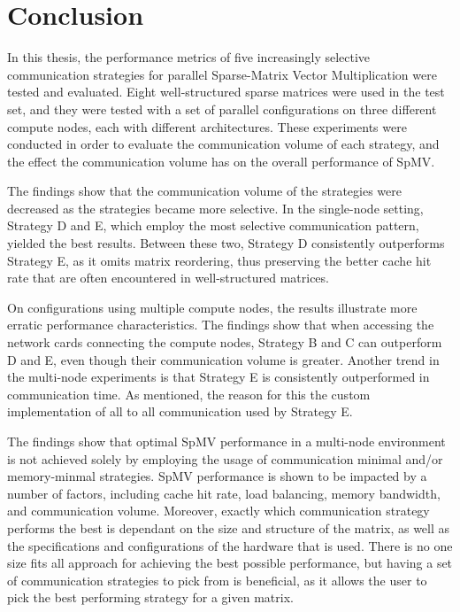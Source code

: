 \chapter{Conclusion}
In this thesis, the performance metrics of five increasingly selective communication strategies for parallel Sparse-Matrix Vector Multiplication were tested and evaluated. Eight well-structured sparse matrices were used in the test set, and they were tested with a set of parallel configurations on three different compute nodes, each with different architectures. These experiments were conducted in order to evaluate the communication volume of each strategy, and the effect the communication volume has on the overall performance of SpMV.
\medskip

The findings show that the communication volume of the strategies were decreased as the strategies became more selective. In the single-node setting, Strategy D and E, which employ the most selective communication pattern, yielded the best results. Between these two, Strategy D consistently outperforms Strategy E, as it omits matrix reordering, thus preserving the better cache hit rate that are often encountered in well-structured matrices. 
\medskip

On configurations using multiple compute nodes, the results illustrate more erratic performance characteristics. The findings show that when accessing the network cards connecting the compute nodes, Strategy B and C can outperform D and E, even though their communication volume is greater. Another trend in the multi-node experiments is that Strategy E is consistently outperformed in communication time. As mentioned, the reason for this the custom implementation of all to all communication used by Strategy E.
\medskip

The findings show that optimal SpMV performance in a multi-node environment is not achieved solely by employing the usage of communication minimal and/or memory-minmal strategies. SpMV performance is shown to be impacted by a number of factors, including cache hit rate, load balancing, memory bandwidth, and communication volume. Moreover, exactly which communication strategy performs the best is dependant on the size and structure of the matrix, as well as the specifications and configurations of the hardware that is used. There is no one size fits all approach for achieving the best possible performance, but having a set of communication strategies to pick from is beneficial, as it allows the user to pick the best performing strategy for a given matrix. 
\medskip


